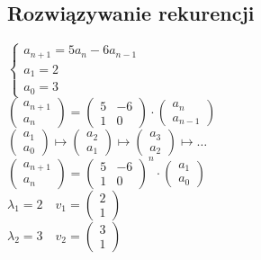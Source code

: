 \subsection{Rozwiązywanie rekurencji} 
$\begin{cases} 
    a_{n+1} = 5a_n - 6a_{n-1} \\ 
    a_1 = 2 \\ 
    a_0 = 3
\end{cases}$ \\ 
$\begin{pmatrix} 
    a_{n+1} \\ a_n
    \end{pmatrix} = \begin{pmatrix} 5 & -6 \\ 1 & 0 \end{pmatrix} \cdot \begin{pmatrix} a_n \\ a_{n-1}
    \end{pmatrix}$ \\ 
$\begin{pmatrix} a_1 \\ a_0 \end{pmatrix} \mapsto \begin{pmatrix} a_2 \\ a_1 \end{pmatrix} 
\mapsto \begin{pmatrix} a_3 \\ a_2 \end{pmatrix} \mapsto \ldots$  \\ 
$\begin{pmatrix} 
    a_{n+1} \\ a_n
    \end{pmatrix} = \begin{pmatrix} 5 & -6 \\ 1 & 0 \end{pmatrix}^n \cdot \begin{pmatrix} a_1 \\ a_0
    \end{pmatrix}$ \\
$\lambda_1 = 2 \quad v_1 = \begin{pmatrix} 2 \\ 1 \end{pmatrix}$ \\ 
$\lambda_2 = 3 \quad v_2 = \begin{pmatrix} 3 \\ 1 \end{pmatrix}$ \\ 
